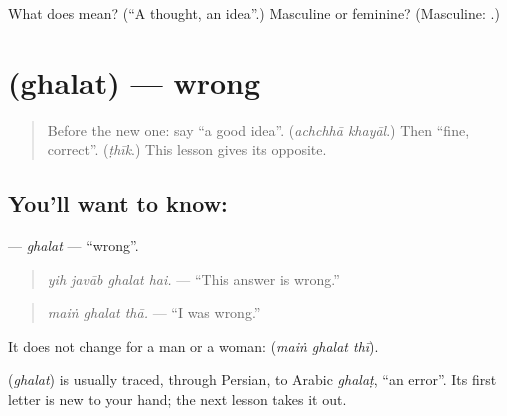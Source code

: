 \begin{tcolorbox}[breakable,colback=teal!4,colframe=teal!35!black,title={Before you move on}]
What does \textbf{} mean? (\textquotedblleft{}A thought, an idea\textquotedblright{}.) Masculine or feminine? (Masculine: \textbf{ }.)
\end{tcolorbox}
\section[\texorpdfstring{\ur{غلط} (ghalat)}{غلط (ghalat)}]{ (ghalat) — wrong}

\label{lesson:UR-C268-ghalat}



\begin{quote}
Before the new one: say \textquotedblleft{}a good idea\textquotedblright{}. (\emph{achchhā khayāl}.) Then \textquotedblleft{}fine, correct\textquotedblright{}. (\emph{ṭhīk}.) This lesson gives its opposite.
\end{quote}

\subsection*{You'll want to know: }
\textbf{} — \emph{ghalat} — \textquotedblleft{}wrong\textquotedblright{}.

\begin{quote}
\textbf{   }
\end{quote}

\begin{quote}
\emph{yih javāb ghalat hai.} — \textquotedblleft{}This answer is wrong.\textquotedblright{}
\end{quote}

\begin{quote}
\textbf{  }
\end{quote}

\begin{quote}
\emph{maiṅ ghalat thā.} — \textquotedblleft{}I was wrong.\textquotedblright{}
\end{quote}

It does not change for a man or a woman: \textbf{  } (\emph{maiṅ ghalat thī}).

\begin{cousinweb}
\textbf{} (\emph{ghalat}) is usually traced, through Persian, to Arabic \emph{ghalaṭ}, \textquotedblleft{}an error\textquotedblright{}. Its first letter is new to your hand; the next lesson takes it out.
\end{cousinweb}

